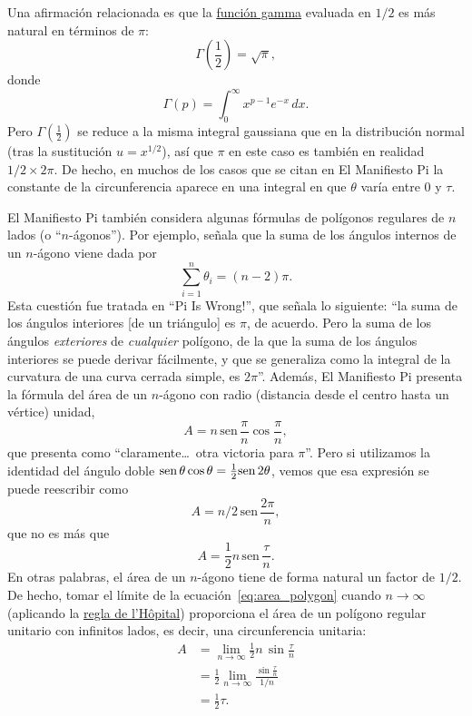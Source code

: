 Una afirmación relacionada es que la \href{http://mathworld.wolfram.com/GammaFunction.html}{función gamma} evaluada en $1/2$ es más natural en términos de $\pi$:
\[
\Gamma(\textstyle{\frac{1}{2}}) = \sqrt{\pi},
\]
donde
\begin{equation}
\label{eq:gamma}
\Gamma(p) = \int_{0}^{\infty} x^{p-1} e^{-x}\,dx.
\end{equation}
Pero $\Gamma(\frac{1}{2})$ se reduce a la misma integral gaussiana que en la distribución normal (tras la sustitución $u = x^{1/2}$), así que $\pi$ en este caso es también en realidad $1/2\times 2\pi$. De hecho, en muchos de los casos que se citan en El Manifiesto Pi la constante de la circunferencia aparece en una integral en que $\theta$ varía entre $0$ y $\tau$.

El Manifiesto Pi también considera algunas fórmulas de polígonos regulares de $n$ lados (o ``$n$-ágonos''). Por ejemplo, señala que la suma de los ángulos internos de un $n$-ágono viene dada por
\[
\sum_{i=1}^n \theta_i=(n-2)\pi.
\]
Esta cuestión fue tratada en ``Pi Is Wrong!'', que señala lo siguiente: ``la suma de los ángulos interiores [de un triángulo] es $\pi$, de acuerdo. Pero la suma de los ángulos \emph{exteriores} de \emph{cualquier} polígono, de la que la suma de los ángulos interiores se puede derivar fácilmente, y que se generaliza como la integral de la curvatura de una curva cerrada simple, es $2\pi$''. Además, El Manifiesto Pi presenta la fórmula del área de un $n$-ágono con radio (distancia desde el centro hasta un vértice) unidad,
\[ A=n\,\mbox{sen}\,\frac{\pi}{n}\cos\frac{\pi}{n}, \]
que presenta como ``claramente\ldots\ otra victoria para $\pi$''. Pero si utilizamos la identidad del ángulo doble $\mbox{sen}\,\theta\cos\theta = \frac{1}{2} \mbox{sen}\, 2\theta$, vemos que esa expresión se puede reescribir como
\[ A = n/2\, \mbox{sen}\,\frac{2\pi}{n}, \]
que no es más que
\begin{equation}
\label{eq:area_polygon}
A = \frac{1}{2} n\, \mbox{sen}\,\frac{\tau}{n}.
\end{equation}
En otras palabras, el área de un $n$-ágono tiene de forma natural un factor de $1/2$. De hecho, tomar el límite de la ecuación~\eqref{eq:area_polygon} cuando $n\rightarrow \infty$ (aplicando la \href{http://mathworld.wolfram.com/LHospitalsRule.html}{regla de l'H\^{o}pital}) proporciona el área de un polígono regular unitario con infinitos lados, es decir, una circunferencia unitaria:
\begin{equation}
\label{eq:lhopital}
\begin{split}
A & = \lim_{n\rightarrow\infty} \frac{1}{2} n\, \sin\frac{\tau}{n} \\
  & = \frac{1}{2} \lim_{n\rightarrow\infty} \frac{\sin\frac{\tau}{n}}{1/n} \\
  & = \tfrac{1}{2}\tau.
\end{split}
\end{equation}

